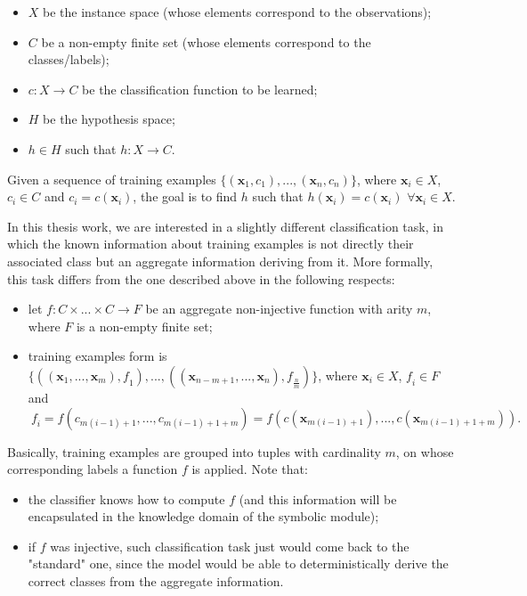 \begin{itemize}
  \item $\mathit{X}$ be the instance space (whose elements correspond to the observations);
  \item $\mathit{C}$ be a non-empty finite set (whose elements correspond to the classes/labels);
  \item $\mathit{c}: \mathit{X} \rightarrow \mathit{C}$ be the classification function to be learned;
  \item $\mathit{H}$ be the hypothesis space;
  \item $\mathit{h} \in \mathit{H}$ such that $h: \mathit{X} \rightarrow \mathit{C}$.
\end{itemize}
Given a sequence of training examples $\{(\mathbf{x}_1,\mathit{c}_1),...,(\mathbf{x}_n,\mathit{c}_n)\}$, where  $\mathbf{x}_i \in \mathit{X}$, $\mathit{c}_i \in \mathit{C}$ and $\mathit{c}_i = \mathit{c}(\mathbf{x}_i)$, the goal is to find $\mathit{h}$ such that $\mathit{h}(\mathbf{x}_i) = \mathit{c}(\mathbf{x}_i)$ $\forall \mathbf{x}_i \in \mathit{X}$.

In this thesis work, we are interested in a slightly different classification task, in which the known information about training examples is not directly their associated class but an aggregate information deriving from it. More formally, this task differs from the one described above in the following respects:

\begin{itemize}
  \item let $\mathit{f}: \mathit{C} \times ... \times \mathit{C} \rightarrow \mathit{F}$ be an aggregate non-injective function with arity $m$, where $\mathit{F}$ is a non-empty finite set;
  \item training examples form is $\{((\mathbf{x}_1,...,\mathbf{x}_m),\mathit{f}_1),...,((\mathbf{x}_{n-m+1},...,\mathbf{x}_n),\mathit{f}_{\frac{n}{m}})\}$, 
  where $\mathbf{x}_i \in \mathit{X}$, $\mathit{f}_i \in \mathit{F}$ and 
\begin{equation}\
	\mathit{f}_i = \mathit{f}(\mathit{c}_{m(i-1)+1},...,\mathit{c}_{m(i-1)+1+m}) = \mathit{f}(\mathit{c(\mathbf{x}_{m(i-1)+1})},...,\mathit{c(\mathbf{x}_{m(i-1)+1+m})}).
\end{equation}
\end{itemize}
Basically, training examples are grouped into tuples with cardinality $m$, on whose corresponding labels a function $\mathit{f}$ is applied. Note that:

\begin{itemize}
  \item the classifier knows how to compute $\mathit{f}$ (and this information will be encapsulated in the knowledge domain of the symbolic module); 
  \item if $\mathit{f}$ was injective, such classification task just would come back to the "standard" one, since the model would be able to deterministically derive the correct classes from the aggregate information.
\end{itemize}